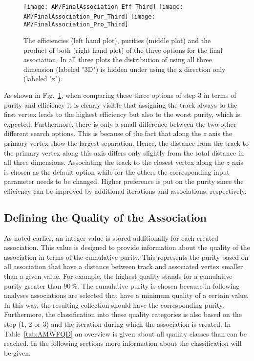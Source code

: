 \begin{figure}[!ht]
    \centering
    \texttt{[image: AM/FinalAssociation\_Eff\_Third]}
    \texttt{[image: AM/FinalAssociation\_Pur\_Third]}
    \texttt{[image: AM/FinalAssociation\_Pro\_Third]}
    \caption[Efficiencies, purities and their product for the three options for the final association]{The efficiencies (left hand plot), purities (middle plot) and the product of both (right hand plot) of the three options for the final association. In all three plots the distribution of using all three dimension (labeled "3D") is hidden under using the z direction only (labeled "z"). \label{plot:AMWFFA}}
\end{figure}

As shown in Fig.~\ref{plot:AMWFFA}, when comparing these three options of step 3 in terms of purity and efficiency it is clearly visible that assigning the track always to the first vertex leads to the highest efficiency but also to the worst purity, which is expected. Furthermore, there is only a small difference between the two other different search options. This is because of the fact that along the $z$ axis the primary vertex show the largest separation. Hence, the distance from the track to the primary vertex along this axis differs only slightly from the total distance in all three dimensions. Associating the track to the closest vertex along the $z$ axis is chosen as the default option while for the others the corresponding input parameter needs to be changed. Higher preference is put on the purity since the efficiency can be improved by additional iterations and associations, respectively.


\subsection{Defining the Quality of the Association\label{sec:AMWFQD}}

As noted earlier, an integer value is stored additionally for each created association. This value is designed to provide information about the quality of the association in terms of the cumulative purity. This represents the purity based on all association that have a distance between track and associated vertex smaller than a given value. For example, the highest quality stands for a cumulative purity greater than $90\,\%$. The cumulative purity is chosen because in following analyses associations are selected that have a minimum quality of a certain value. In this way, the resulting collection should have the corresponding purity.  Furthermore, the classification into these quality categories is also based on the step (1, 2 or 3) and the iteration during which the association is created. In Table~\ref{tab:AMWFQD} an overview is given about all quality classes than can be reached. In the following sections more information about the classification will be given.


